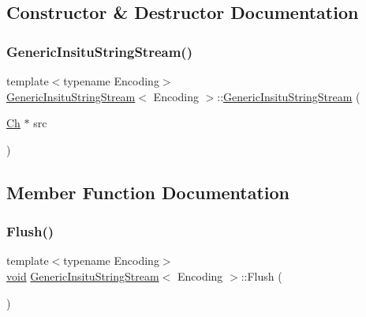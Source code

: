 \subsection{Constructor \& Destructor Documentation}
\mbox{\label{structGenericInsituStringStream_ad8b8417f0501ac261c7232023292c183}} 
\subsubsection{\texorpdfstring{Generic\+Insitu\+String\+Stream()}{GenericInsituStringStream()}}
{\footnotesize\ttfamily template$<$typename Encoding$>$ \\
\hyperlink{structGenericInsituStringStream}{Generic\+Insitu\+String\+Stream}$<$ Encoding $>$\+::\hyperlink{structGenericInsituStringStream}{Generic\+Insitu\+String\+Stream} (\begin{DoxyParamCaption}\item[{\hyperlink{structGenericInsituStringStream_a277308a58f551f11d0d9a20823702b5a}{Ch} $\ast$}]{src }\end{DoxyParamCaption})\hspace{0.3cm}{\ttfamily [inline]}}



\subsection{Member Function Documentation}
\mbox{\label{structGenericInsituStringStream_a53597dc98a03a6a051c37c4f1046bd04}} 
\subsubsection{\texorpdfstring{Flush()}{Flush()}}
{\footnotesize\ttfamily template$<$typename Encoding$>$ \\
\hyperlink{imgui__impl__opengl3__loader_8h_ac668e7cffd9e2e9cfee428b9b2f34fa7}{void} \hyperlink{structGenericInsituStringStream}{Generic\+Insitu\+String\+Stream}$<$ Encoding $>$\+::Flush (\begin{DoxyParamCaption}{ }\end{DoxyParamCaption})\hspace{0.3cm}{\ttfamily [inline]}}

